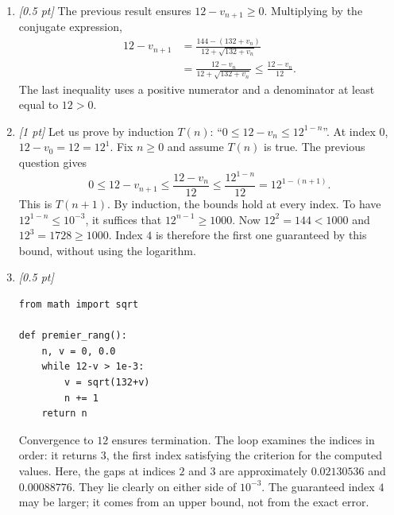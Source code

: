 \begin{enumerate}
\item \textit{[0.5 pt]} The previous result ensures $12-v_{n+1}\ge0$. Multiplying by the conjugate expression,
\[\begin{aligned}12-v_{n+1}&=\frac{144-(132+v_n)}{12+\sqrt{132+v_n}}\\&=\frac{12-v_n}{12+\sqrt{132+v_n}}\le\frac{12-v_n}{12}.\end{aligned}\]
The last inequality uses a positive numerator and a denominator at least equal to $12>0$.

\item \textit{[1 pt]} Let us prove by induction $T(n)$: ``$0\le 12-v_n\le 12^{1-n}$''.
At index $0$, $12-v_0=12=12^1$. Fix $n\ge0$ and assume $T(n)$ is true. The previous question gives
\[0\le 12-v_{n+1}\le\frac{12-v_n}{12}\le\frac{12^{1-n}}{12}=12^{1-(n+1)}.\]
This is $T(n+1)$. By induction, the bounds hold at every index.
To have $12^{1-n}\le10^{-3}$, it suffices that $12^{n-1}\ge1000$.
Now $12^{2}=144<1000$ and $12^{3}=1728\ge1000$. Index $4$ is therefore the first one guaranteed by this bound, without using the logarithm.


\item \textit{[0.5 pt]} 
\begin{lstlisting}
from math import sqrt

def premier_rang():
    n, v = 0, 0.0
    while 12-v > 1e-3:
        v = sqrt(132+v)
        n += 1
    return n
\end{lstlisting}
Convergence to $12$ ensures termination. The loop examines the indices in order: it returns $3$, the first index satisfying the criterion for the computed values. Here, the gaps at indices $2$ and $3$ are approximately $0.02130536$ and $0.00088776$. They lie clearly on either side of $10^{-3}$. The guaranteed index $4$ may be larger; it comes from an upper bound, not from the exact error.

\end{enumerate}

